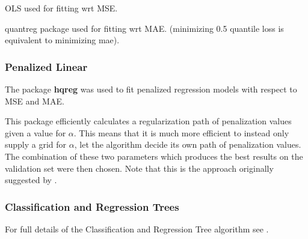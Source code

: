 \documentclass[a4paper, table]{article}
\begin{document}
OLS used for fitting wrt MSE.

quantreg package used for fitting wrt MAE. (minimizing 0.5 quantile loss is equivalent to minimizing mae).

\subsubsection{Penalized Linear}

The package \textbf{hqreg} was used to fit penalized regression models with respect to MSE and MAE.

This package efficiently calculates a regularization path of penalization values given a value for $\alpha$. This means that it is much more efficient to instead only supply a grid for $\alpha$, let the algorithm decide its own path of penalization values. The combination of these two parameters which produces the best results on the validation set were then chosen. Note that this is the approach originally suggested by \cite{zou_regularization_2005}.

\subsubsection{Classification and Regression Trees}

For full details of the Classification and Regression Tree algorithm see \cite{breiman_classification_1984}. 
\end{document}
